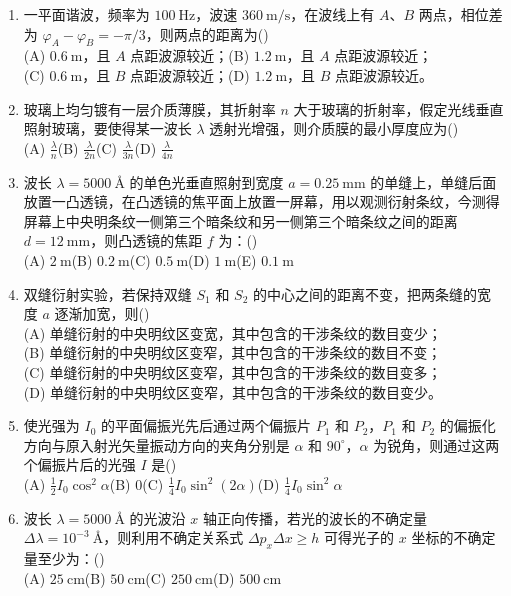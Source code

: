 \documentclass[zihao=5,a4paper,UTF8]{ctexart}
\newcommand{\choicebox}{\hfill(\hspace{1.8em})}
\begin{document}
\begin{enumerate}[leftmargin=2em, itemsep=6pt]
    \item 一平面谐波，频率为 $100\ \mathrm{Hz}$，波速 $360\ \mathrm{m/s}$，在波线上有 $A$、$B$ 两点，相位差为 $\varphi_A - \varphi_B = -\pi/3$，则两点的距离为\choicebox\\
    (A) $0.6\ \mathrm{m}$，且 $A$ 点距波源较近；\qquad (B) $1.2\ \mathrm{m}$，且 $A$ 点距波源较近；\\
    (C) $0.6\ \mathrm{m}$，且 $B$ 点距波源较近；\qquad (D) $1.2\ \mathrm{m}$，且 $B$ 点距波源较近。

    \item 玻璃上均匀镀有一层介质薄膜，其折射率 $n$ 大于玻璃的折射率，假定光线垂直照射玻璃，要使得某一波长 $\lambda$ 透射光增强，则介质膜的最小厚度应为\choicebox\\
    (A) $\frac{\lambda}{n}$\qquad (B) $\frac{\lambda}{2n}$\qquad (C) $\frac{\lambda}{3n}$\qquad (D) $\frac{\lambda}{4n}$

    \item 波长 $\lambda = 5000\ \text{\AA}$ 的单色光垂直照射到宽度 $a=0.25\ \mathrm{mm}$ 的单缝上，单缝后面放置一凸透镜，在凸透镜的焦平面上放置一屏幕，用以观测衍射条纹，今测得屏幕上中央明条纹一侧第三个暗条纹和另一侧第三个暗条纹之间的距离 $d=12\ \mathrm{mm}$，则凸透镜的焦距 $f$ 为：\choicebox\\
    (A) $2\ \mathrm{m}$\qquad (B) $0.2\ \mathrm{m}$\qquad (C) $0.5\ \mathrm{m}$\qquad (D) $1\ \mathrm{m}$\qquad (E) $0.1\ \mathrm{m}$

    \item 双缝衍射实验，若保持双缝 $S_1$ 和 $S_2$ 的中心之间的距离不变，把两条缝的宽度 $a$ 逐渐加宽，则\choicebox\\
    (A) 单缝衍射的中央明纹区变宽，其中包含的干涉条纹的数目变少；\\
    (B) 单缝衍射的中央明纹区变窄，其中包含的干涉条纹的数目不变；\\
    (C) 单缝衍射的中央明纹区变窄，其中包含的干涉条纹的数目变多；\\
    (D) 单缝衍射的中央明纹区变窄，其中包含的干涉条纹的数目变少。

    \item 使光强为 $I_0$ 的平面偏振光先后通过两个偏振片 $P_1$ 和 $P_2$，$P_1$ 和 $P_2$ 的偏振化方向与原入射光矢量振动方向的夹角分别是 $\alpha$ 和 $90^\circ$，$\alpha$ 为锐角，则通过这两个偏振片后的光强 $I$ 是\choicebox\\
    (A) $\frac{1}{2}I_0\cos^2\alpha$\qquad (B) $0$\qquad (C) $\frac{1}{4}I_0\sin^2(2\alpha)$\qquad (D) $\frac{1}{4}I_0\sin^2\alpha$

    \item 波长 $\lambda=5000\ \text{\AA}$ 的光波沿 $x$ 轴正向传播，若光的波长的不确定量 $\Delta\lambda = 10^{-3}\ \text{\AA}$，则利用不确定关系式 $\Delta p_x \Delta x \ge h$ 可得光子的 $x$ 坐标的不确定量至少为：\choicebox\\
    (A) $25\ \mathrm{cm}$\qquad (B) $50\ \mathrm{cm}$\qquad (C) $250\ \mathrm{cm}$\qquad (D) $500\ \mathrm{cm}$


\end{enumerate}
\end{document}
